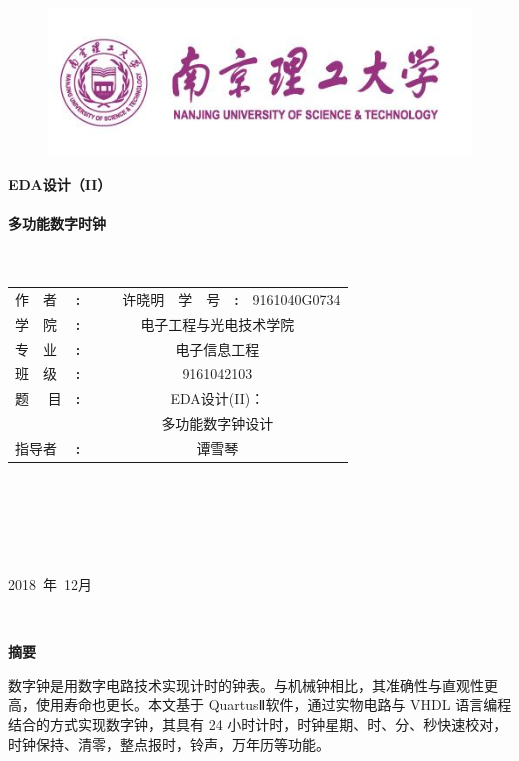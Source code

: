 \documentclass[12pt]{article}
\begin{document}
\begin{center}
\renewcommand\refname{参考文献}

\renewcommand\appendix{\setcounter{secnumdepth}{0}}
\begin{figure}[h]
\centering
  \includegraphics[width=.6\textwidth]{image001.png} 
\end{figure}
\thispagestyle{empty}
\songti{}\textbf{EDA设计（II）}\\ 
\ \\ \textbf{多功能数字时钟}\\\ \\\ 
\renewcommand\arraystretch{1.5}
\begin{tabular}{p{1.7cm}p{0.2cm}p{3.5cm}p{1.7cm}p{0.2cm}p{3.5cm}}
作\ \  者&\textbf{:}&\ \ \ \ 许晓明&学\  \ 号&\textbf{:}&9161040G0734\\\cline{3-3}\cline{6-6}
学\  \ 院&\textbf{:}&\multicolumn{4}{c}{电子工程与光电技术学院}\\\cline{3-6}
专\ \ 业&\textbf{:}&\multicolumn{4}{c}{电子信息工程}\\\cline{3-6}
班\ \ 级&\textbf{:}&\multicolumn{4}{c}{9161042103}\\\cline{3-6}
题 \ \ 目&\textbf{:}&\multicolumn{4}{c}{EDA设计(II)：}\\\cline{3-6}
&&\multicolumn{4}{c}{多功能数字钟设计}\\\cline{3-6}
指导者&\textbf{:}&\multicolumn{4}{c}{谭雪琴}\\\cline{3-6}
\end{tabular}\\
\ \\
\ \\
\ \\
\ \\
2018\ 年\ 12月
\end{center}
\newpage
\ 
\thispagestyle{empty}
\newpage
\thispagestyle{empty}
\newpage
\thispagestyle{empty}
\begin{center}\textbf{摘要}\end{center}
\par
数字钟是用数字电路技术实现计时的钟表。与机械钟相比，其准确性与直观性更高，使用寿命也更长。本文基于 QuartusⅡ软件，通过实物电路与 VHDL 语言编程结合的方式实现数字钟，其具有 24 小时计时，时钟星期、时、分、秒快速校对，时钟保持、清零，整点报时，铃声，万年历等功能。\par
\end{document}
